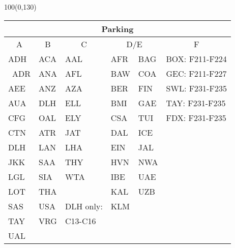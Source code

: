\documentclass[10pt,landscape,a4paper]{article}
\begin{document}
\begin{textblock}{100}(0,130)
\begin{table}[]
\begin{tabular}{|l|l|l|ll|l|}

\multicolumn{6}{c}{\textbf{Parking}}                                                                                           \\ \hline
\multicolumn{1}{|c|}{A} & \multicolumn{1}{c|}{B} & \multicolumn{1}{c|}{C} & \multicolumn{2}{c|}{D/E}    & \multicolumn{1}{c|}{F} \\ \hline
ADH                     & ACA                    & AAL                    & AFR                   & BAG & BOX: F211-F224         \\ \
ADR                     & ANA                    & AFL                    & BAW                   & COA & GEC: F211-F227         \\
AEE                     & ANZ                    & AZA                    & BER                   & FIN & SWL: F231-F235         \\
AUA                     & DLH                    & ELL                    & BMI                   & GAE & TAY: F231-F235         \\
CFG                     & OAL                    & ELY                    & CSA                   & TUI & FDX: F231-F235         \\
CTN                     & ATR                    & JAT                    & DAL                   & ICE &                        \\
DLH                     & LAN                    & LHA                    & EIN                   & JAL &                        \\
JKK                     & SAA                    & THY                    & HVN                   & NWA &                        \\
LGL                     & SIA                    & WTA                    & IBE                   & UAE &                        \\
LOT                     & THA                    &                        & KAL                   & UZB &                        \\
SAS                     & USA                    & DLH only:              & KLM                   &     &                        \\
TAY                     & VRG                    & C13-C16                &                       &     &                        \\
UAL                     &                        &                        & \multicolumn{1}{l}{} &     &                        \\ \hline
\end{tabular}
\end{table}
\end{textblock}
\end{document}
